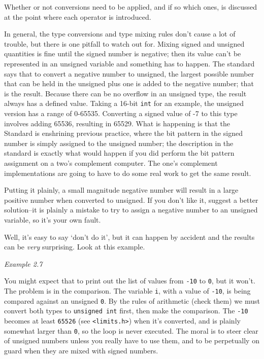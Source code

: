     Whether or not conversions need to be applied, and if so which ones, is
     discussed at the point where each operator is introduced.


    In general, the type conversions and type mixing rules don't cause a
     lot of trouble, but there is one pitfall to watch out for. Mixing signed
     and unsigned quantities is fine until the signed number is negative; then
     its value can't be represented in an unsigned variable and something has
     to happen. The standard says that to convert a negative number to
     unsigned, the largest possible number that can be held in the unsigned
     plus one is added to the negative number; that is the result. Because
     there can be no overflow in an unsigned type, the result always has a
     defined value. Taking a 16-bit \texttt{int} for an example, the
     unsigned version has a range of 0-65535. Converting a signed value
     of -7 to this type involves adding 65536, resulting
     in 65529. What is happening is that the Standard is enshrining
     previous practice, where the bit pattern in the signed number is simply
     assigned to the unsigned number; the description in the standard is
     exactly what would happen if you did perform the bit pattern assignment
     on a two's complement computer. The one's complement implementations are
     going to have to do some real work to get the same result.


    Putting it plainly, a small magnitude negative number will result in a
     large positive number when converted to unsigned. If you don't like it,
     suggest a better solution--it is plainly a mistake to try to assign
     a negative number to an unsigned variable, so it's your own fault.


    Well, it's easy to say `don't do it', but it can happen by
     accident and the results can be \textit{very} surprising. Look at this
     example.


    \begin{center}\textit{Example 2.7}\end{center}


    You might expect that to print out the list of values
     from \texttt{-10} to \texttt{0}, but it won't. The
     problem is in the comparison. The variable \texttt{i}, with a
     value of \texttt{-10}, is being compared against an
     unsigned \texttt{0}. By the rules of arithmetic (check them) we
     must convert both types to \texttt{unsigned int} first, then make the
     comparison. The \texttt{-10} becomes at
     least \texttt{65526} (see \texttt{<limits.h>}) when
     it's converted, and is plainly somewhat larger than \texttt{0},
     so the loop is never executed. The moral is to steer clear of unsigned
     numbers unless you really have to use them, and to be perpetually on
     guard when they are mixed with signed numbers.


